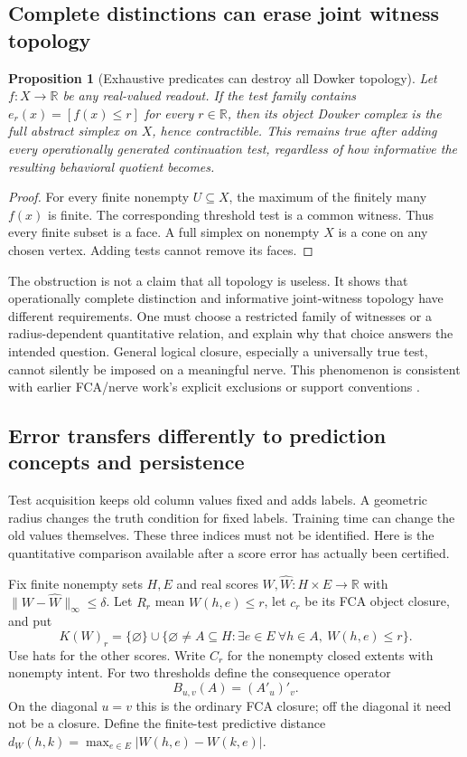\documentclass[11pt]{article}
\newtheorem{proposition}[theorem]{Proposition}
\theoremstyle{definition}\newtheorem{definition}[theorem]{Definition}
\theoremstyle{remark}\newtheorem{remark}[theorem]{Remark}
\newcommand{\R}{\mathbb R}
\begin{document}
\subsection{Complete distinctions can erase joint witness topology}
\begin{proposition}[Exhaustive predicates can destroy all Dowker topology]
Let $f:X\to\R$ be any real-valued readout. If the test family contains
$e_r(x)=[f(x)\leq r]$ for every $r\in\R$, then its object Dowker complex
is the full abstract simplex on $X$, hence contractible. This remains true
after adding every operationally generated continuation test, regardless
of how informative the resulting behavioral quotient becomes.
\end{proposition}
\begin{proof}
For every finite nonempty $U\subseteq X$, the maximum of the finitely many
$f(x)$ is finite. The corresponding threshold test is a common witness.
Thus every finite subset is a face. A full simplex on nonempty $X$ is a
cone on any chosen vertex. Adding tests cannot remove its faces.
\end{proof}
The obstruction is not a claim that all topology is useless. It shows that
operationally complete distinction and informative joint-witness topology
have different requirements. One must choose a restricted family of
witnesses or a radius-dependent quantitative relation, and explain why that
choice answers the intended question. General logical closure, especially
a universally true test, cannot silently be imposed on a meaningful nerve.
This phenomenon is consistent with earlier FCA/nerve work's explicit
exclusions or support conventions \cite{ayzenberg,gratus}.


\subsection{Error transfers differently to prediction concepts and persistence}
Test acquisition keeps old column values fixed and adds labels. A geometric
radius changes the truth condition for fixed labels. Training time can
change the old values themselves. These three indices must not be identified.
Here is the quantitative comparison available after a score error has
actually been certified.

Fix finite nonempty sets $H,E$ and real scores $W,\widehat W:H\times E\to\R$
with $\|W-\widehat W\|_\infty\leq\delta$. Let $R_r$ mean $W(h,e)\leq r$,
let $c_r$ be its FCA object closure, and put
\[
 K(W)_r=\{\varnothing\}\cup
 \{\varnothing\ne A\subseteq H:\exists e\in E\ 
                      \forall h\in A,\ W(h,e)\leq r\}.
\]
Use hats for the other scores. Write $C_r$ for the nonempty closed extents
with nonempty intent. For two thresholds define the consequence operator
\[
 B_{u,v}(A)=(A'_u)'_v.
\]
On the diagonal $u=v$ this is the ordinary FCA closure; off the diagonal
it need not be a closure. Define the
finite-test predictive distance
$d_W(h,k)=\max_{e\in E}|W(h,e)-W(k,e)|$.
\end{document}
